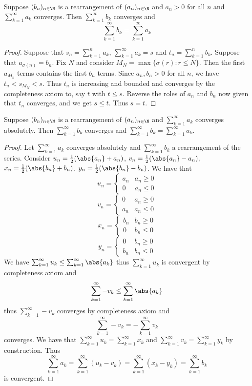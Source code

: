 \begin{thm}{}{} Suppose $(b_n)_{n\in\N}$ is a rearrangement of $(a_n)_{n\in\N}$ and $a_n>0$ for all $n$ and $\sum_{k=1}^{\infty}a_k$ converges. Then $\sum_{k=1}^{\infty}b_k$ converges and $$\sum_{k=1}^{\infty}b_k=\sum_{k=1}^{\infty}a_k$$ \tcbline
\begin{proof} Suppose that $s_n=\sum_{k=1}^{n}a_k$, $\sum_{k=1}^{\infty}a_k=s$ and $t_n=\sum_{k=1}^{n}b_k$. Suppose that $a_{\sigma(n)}=b_n$. Fix $N$ and consider $M_N=\max\{\sigma(r):r\leq N\}$. Then the first $a_{M_n}$ terms contains the first $b_n$ terms. Since $a_n,b_n>0$ for all $n$, we have $t_n<s_{M_N}<s$. Thus $t_n$ is increasing and bounded and converges by the completeness axiom to, say $t$ with $t\leq s$. Reverse the roles of $a_n$ and $b_n$ now given that $t_n$ converges, and we get $s\leq t$. Thus $s=t$. 
\end{proof}
\end{thm}

\begin{thm}{}{} Suppose $(b_n)_{n\in\N}$ is a rearrangement of $(a_n)_{n\in\N}$ and $\sum_{k=1}^{\infty}a_k$ converges absolutely. Then $\sum_{k=1}^{\infty}b_k$ converges and $\sum_{k=1}^{\infty}b_k=\sum_{k=1}^{\infty}a_k$. \tcbline
\begin{proof}
Let $\sum_{k=1}^{\infty}a_k$ converges absolutely and $\sum_{k=1}^{\infty}b_k$ a rearrangement of the series. Consider $u_n=\frac{1}{2}(\abs{a_n}+a_n)$, $v_n=\frac{1}{2}(\abs{a_n}-a_n)$, $x_n=\frac{1}{2}(\abs{b_n}+b_n)$, $y_n=\frac{1}{2}(\abs{b_n}-b_n)$. We have that $$u_n=\begin{cases}
a_n & a_n\geq0\\
0 & a_n\leq 0
\end{cases}$$ $$v_n=\begin{cases}
0 & a_n\geq0\\
a_n & a_n\leq 0
\end{cases}$$ $$x_n=\begin{cases}
b_n & b_n\geq0\\
0 & b_n\leq 0
\end{cases}$$ $$y_n=\begin{cases}
0 & b_n\geq0\\
b_n & b_n\leq 0
\end{cases}$$
We have $\sum_{k=1}^{\infty}u_k\leq\sum_{k=1}^{\infty}\abs{a_k}$ thus $\sum_{k=1}^{\infty}u_k$ is convergent by completeness axiom and $$\sum_{k=1}^{\infty}-v_k\leq\sum_{k=1}^{\infty}\abs{a_k}$$ thus $\sum_{k=1}^{\infty}-v_k$ converges by completeness axiom and $$\sum_{k=1}^{\infty}-v_k=-\sum_{k=1}^{\infty}v_k$$ converges. We have that $\sum_{k=1}^{\infty} u_k=\sum_{k=1}^{\infty} x_k$ and $\sum_{k=1}^{\infty} v_k=\sum_{k=1}^{\infty} y_k$ by construction. Thus $$\sum_{k=1}^{\infty} a_k=\sum_{k=1}^{\infty}(u_k-v_k)=\sum_{k=1}^{\infty}(x_k-y_k)=\sum_{k=1}^{\infty} b_k$$ is convergent. 
\end{proof}
\end{thm}

